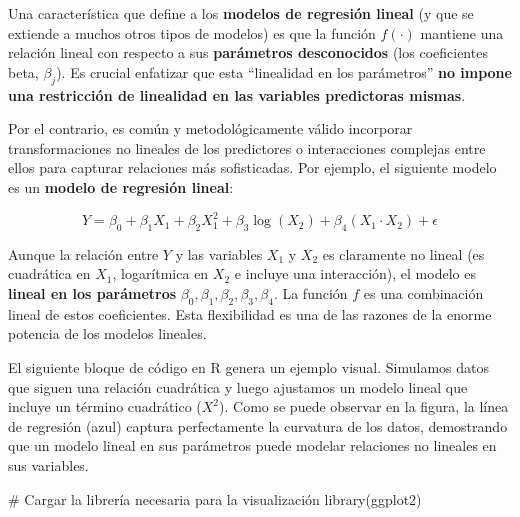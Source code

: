 \documentclass[
  letterpaper,
  DIV=11,
  numbers=noendperiod]{scrreprt}
\newenvironment{Shaded}{\begin{snugshade}}{\end{snugshade}}
\newcommand{\CommentTok}[1]{\textcolor[rgb]{0.37,0.37,0.37}{#1}}
\newcommand{\FunctionTok}[1]{\textcolor[rgb]{0.28,0.35,0.67}{#1}}
\newcommand{\NormalTok}[1]{\textcolor[rgb]{0.00,0.23,0.31}{#1}}
\begin{document}
\begin{tcolorbox}[enhanced jigsaw, breakable, toprule=.15mm, bottomtitle=1mm, coltitle=black, colbacktitle=quarto-callout-caution-color!10!white, titlerule=0mm, opacitybacktitle=0.6, bottomrule=.15mm, toptitle=1mm, title=\textcolor{quarto-callout-caution-color}{\faFire}\hspace{0.5em}{Linealidad en los parámetros, no en las variables}, arc=.35mm, rightrule=.15mm, opacityback=0, colframe=quarto-callout-caution-color-frame, leftrule=.75mm, left=2mm, colback=white]

Una característica que define a los \textbf{modelos de regresión lineal}
(y que se extiende a muchos otros tipos de modelos) es que la función
\(f(\cdot)\) mantiene una relación lineal con respecto a sus
\textbf{parámetros desconocidos} (los coeficientes beta, \(\beta_j\)).
Es crucial enfatizar que esta ``linealidad en los parámetros''
\textbf{no impone una restricción de linealidad en las variables
predictoras mismas}.

Por el contrario, es común y metodológicamente válido incorporar
transformaciones no lineales de los predictores o interacciones
complejas entre ellos para capturar relaciones más sofisticadas. Por
ejemplo, el siguiente modelo es un \textbf{modelo de regresión lineal}:

\[Y = \beta_0 + \beta_1 X_1 + \beta_2 X_1^2 + \beta_3 \log(X_2) + \beta_4 (X_1 \cdot X_2) + \epsilon\]

Aunque la relación entre \(Y\) y las variables \(X_1\) y \(X_2\) es
claramente no lineal (es cuadrática en \(X_1\), logarítmica en \(X_2\) e
incluye una interacción), el modelo es \textbf{lineal en los parámetros}
\(\beta_0, \beta_1, \beta_2, \beta_3, \beta_4\). La función \(f\) es una
combinación lineal de estos coeficientes. Esta flexibilidad es una de
las razones de la enorme potencia de los modelos lineales.

El siguiente bloque de código en R genera un ejemplo visual. Simulamos
datos que siguen una relación cuadrática y luego ajustamos un modelo
lineal que incluye un término cuadrático (\(X^2\)). Como se puede
observar en la figura, la línea de regresión (azul) captura
perfectamente la curvatura de los datos, demostrando que un modelo
lineal en sus parámetros puede modelar relaciones no lineales en sus
variables.

\begin{Shaded}
\begin{Highlighting}[]
\CommentTok{\# Cargar la librería necesaria para la visualización}
\FunctionTok{library}\NormalTok{(ggplot2)}


\end{Highlighting}
\end{Shaded}
\end{tcolorbox}
\end{document}
